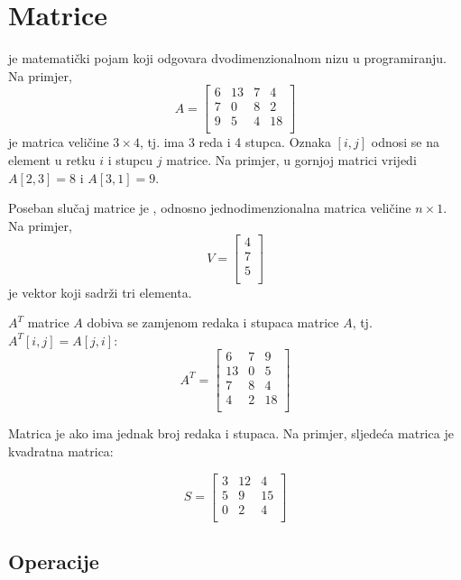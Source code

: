 \chapter{Matrice}


 je matematički pojam
koji odgovara dvodimenzionalnom nizu
u programiranju. Na primjer,
\[
A = 
 \begin{bmatrix}
  6 & 13 & 7 & 4 \\
  7 & 0 & 8 & 2 \\
  9 & 5 & 4 & 18 \\
 \end{bmatrix}
\]
je matrica veličine $3 \times 4$, tj.
ima 3 reda i 4 stupca.
Oznaka $[i,j]$ odnosi se na
element u retku $i$ i stupcu $j$
matrice.
Na primjer, u gornjoj matrici vrijedi
$A[2,3]=8$ i $A[3,1]=9$.


Poseban slučaj matrice je ,
odnosno jednodimenzionalna matrica veličine $n \times 1$.
Na primjer,
\[
V =
\begin{bmatrix}
4 \\
7 \\
5 \\
\end{bmatrix}
\]
je vektor koji sadrži tri elementa.


 $A^T$ matrice $A$
dobiva se zamjenom redaka i stupaca matrice $A$,
tj. $A^T[i,j]=A[j,i]$:
\[
A^T = 
 \begin{bmatrix}
  6 & 7 & 9 \\
  13 & 0 & 5 \\
  7 & 8 & 4 \\
  4 & 2 & 18 \\
 \end{bmatrix}
\]


Matrica je  ako
ima jednak broj redaka i stupaca.
Na primjer, sljedeća matrica je
kvadratna matrica:

\[
S = 
 \begin{bmatrix}
  3 & 12 & 4  \\
  5 & 9 & 15  \\
  0 & 2 & 4 \\
 \end{bmatrix}
\]

\section{Operacije}

